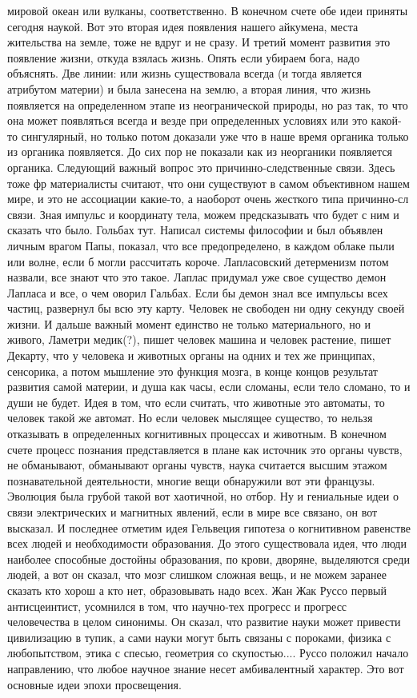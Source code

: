 \documentclass[a4paper, 12pt]{article}
\begin{document}
мировой океан или вулканы, соответственно. В конечном счете обе идеи 
приняты сегодня наукой. Вот это вторая идея появления нашего айкумена, 
места жительства на земле, тоже не вдруг и не сразу. И третий момент 
развития это появление жизни, откуда взялась жизнь. Опять если убираем 
бога, надо объяснять. Две линии: или жизнь существовала всегда (и тогда 
является атрибутом материи) и была занесена на землю, а вторая линия, 
что жизнь появляется на определенном этапе из неогранической природы, но 
раз так, то что она может появляться всегда и везде при определенных 
условиях или это какой-то сингулярный, но только потом доказали уже что 
в наше время органика только из органика появляется. До сих пор не 
показали как из неорганики появляется органика. Следующий важный вопрос 
это причинно-следственные связи. Здесь тоже фр материалисты считают, что 
они существуют в самом объективном нашем мире, и это не ассоциации 
какие-то, а наоборот очень жесткого типа причинно-сл связи. Зная импульс 
и координату тела, можем предсказывать что будет с ним и сказать что 
было. Гольбах тут. Написал системы философии и был объявлен личным 
врагом Папы, показал, что все предопределено, в каждом облаке пыли или 
волне, если б могли рассчитать короче. Лапласовский детерменизм потом 
назвали, все знают что это такое. Лаплас придумал уже свое существо 
демон Лапласа и все, о чем оворил Гальбах. Если бы демон знал все 
импульсы всех частиц, развернул бы всю эту карту. Человек не свободен ни 
одну секунду своей жизни. И дальше важный момент единство не только 
материального, но и живого, Ламетри медик(?), пишет человек машина 
и человек растение, пишет Декарту, что у человека и животных органы на 
одних и тех же принципах, сенсорика, а потом мышление это функция мозга, 
в конце концов результат развития самой материи, и душа как часы, если 
сломаны, если тело сломано, то и души не будет. Идея в том, что если 
считать, что животные это автоматы, то человек такой же автомат. Но если 
человек мыслящее существо, то нельзя отказывать в определенных 
когнитивных процессах и животным. В конечном счете процесс познания 
представляется в плане как источник это органы чувств, не обманывают, 
обманывают органы чувств, наука считается высшим этажом познавательной 
деятельности, многие вещи обнаружили вот эти французы. Эволюция была 
грубой такой вот хаотичной, но отбор. Ну и гениальные идеи о связи 
электрических и магнитных явлений, если в мире все связано, он вот 
высказал. И последнее отметим идея Гельвеция гипотеза о когнитивном 
равенстве всех людей и необходимости образования. До этого существовала 
идея, что люди наиболее способные достойны образования, по крови, 
дворяне, выделяются среди людей, а вот он сказал, что мозг слишком 
сложная вещь, и не можем заранее сказать кто хорош а кто нет, 
образовывать надо всех. Жан Жак Руссо первый антисцеинтист, усомнился 
в том, что научно-тех прогресс и прогресс человечества в целом синонимы. 
Он сказал, что развитие науки может привести цивилизацию в тупик, а сами 
науки могут быть связаны с пороками, физика с любопытством, этика 
с спесью, геометрия со скупостью.... Руссо положил начало направлению, 
что любое научное знание несет амбивалентный характер. Это вот основные 
идеи эпохи просвещения.
\end{document}
